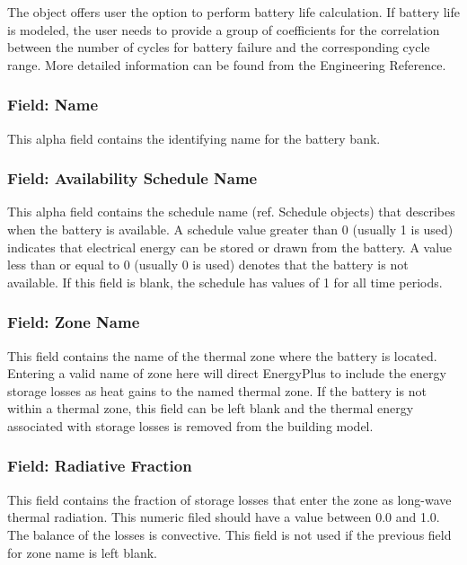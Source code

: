 The object offers user the option to perform battery life calculation. If battery life is modeled, the user needs to provide a group of coefficients for the correlation between the number of cycles for battery failure and the corresponding cycle range. More detailed information can be found from the Engineering Reference.

\subsubsection{Field: Name}\label{field-name-7-004}

This alpha field contains the identifying name for the battery bank.

\subsubsection{Field: Availability Schedule Name}\label{field-availability-schedule-name-6-000}

This alpha field contains the schedule name (ref. Schedule objects) that describes when the battery is available. A schedule value greater than 0 (usually 1 is used) indicates that electrical energy can be stored or drawn from the battery. A value less than or equal to 0 (usually 0 is used) denotes that the battery is not available. If this field is blank, the schedule has values of 1 for all time periods.

\subsubsection{Field: Zone Name}\label{field-zone-name-6-000}

This field contains the name of the thermal zone where the battery is located. Entering a valid name of zone here will direct EnergyPlus to include the energy storage losses as heat gains to the named thermal zone. If the battery is not within a thermal zone, this field can be left blank and the thermal energy associated with storage losses is removed from the building model.

\subsubsection{Field: Radiative Fraction}\label{field-radiative-fraction-4}

This field contains the fraction of storage losses that enter the zone as long-wave thermal radiation. This numeric filed should have a value between 0.0 and 1.0. The balance of the losses is convective. This field is not used if the previous field for zone name is left blank.

